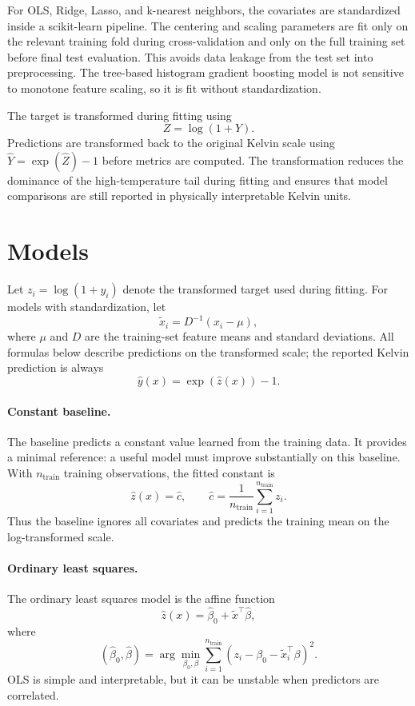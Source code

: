 \documentclass[11pt,a4paper]{article}
\begin{document}
For OLS, Ridge, Lasso, and k-nearest neighbors, the covariates are standardized
inside a scikit-learn pipeline. The centering and scaling parameters are fit only
on the relevant training fold during cross-validation and only on the full
training set before final test evaluation. This avoids data leakage from the test
set into preprocessing. The tree-based histogram gradient boosting model is not
sensitive to monotone feature scaling, so it is fit without standardization.

The target is transformed during fitting using
\[
Z=\log(1+Y).
\]
Predictions are transformed back to the original Kelvin scale using
\(\widehat Y=\exp(\widehat Z)-1\) before metrics are computed. The transformation
reduces the dominance of the high-temperature tail during fitting and ensures that
model comparisons are still reported in physically interpretable Kelvin units.

\section{Models}

Let \(z_i=\log(1+y_i)\) denote the transformed target used during fitting. For
models with standardization, let
\[
\widetilde x_i = D^{-1}(x_i-\mu),
\]
where \(\mu\) and \(D\) are the training-set feature means and standard
deviations. All formulas below describe predictions on the transformed scale; the
reported Kelvin prediction is always
\[
\widehat y(x)=\exp(\widehat z(x))-1.
\]

\paragraph{Constant baseline.}
The baseline predicts a constant value learned from the training data. It provides
a minimal reference: a useful model must improve substantially on this baseline.
With \(n_{\mathrm{train}}\) training observations, the fitted constant is
\[
\widehat z(x)=\widehat c,\qquad
\widehat c=\frac{1}{n_{\mathrm{train}}}\sum_{i=1}^{n_{\mathrm{train}}}z_i.
\]
Thus the baseline ignores all covariates and predicts the training mean on the
log-transformed scale.

\paragraph{Ordinary least squares.}
The ordinary least squares model is the affine function
\[
\widehat z(x)=\widehat\beta_0+\widetilde x^\top\widehat\beta,
\]
where
\[
(\widehat\beta_0,\widehat\beta)
=\arg\min_{\beta_0,\beta}
\sum_{i=1}^{n_{\mathrm{train}}}
\left(z_i-\beta_0-\widetilde x_i^\top\beta\right)^2 .
\]
OLS is simple and interpretable, but it can be unstable when predictors are
correlated.
\end{document}
